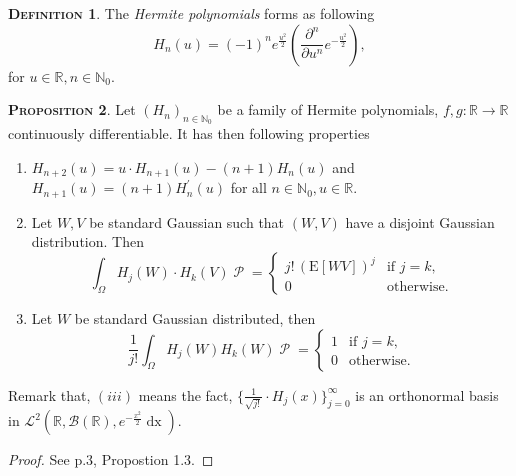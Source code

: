 \documentclass[a4paper, twoside, 11pt]{article}
\theoremstyle{definition}
\newtheorem{definition}{\scshape Definition}[section]
\newtheorem{proposition}[definition]{\scshape Proposition}
\begin{document}
\begin{definition}
  The \emph{Hermite polynomials} forms as following
  \begin{equation}
	H_n(u) = (-1)^n e^{\frac{u^2}{2}} (\frac{\partial^n }{\partial u^n}e^{-\frac{u^2}{2}}),
	\label{sec:hermite}
  \end{equation}
  for $u\in \mathbb{R}, n\in \mathbb{N}_0$. 
\end{definition}
\begin{proposition}
  Let $(H_n)_{n\in \mathbb{N}_0}$ be a family of Hermite polynomials, $f, g: \mathbb{R}\rightarrow \mathbb{R}$ continuously differentiable. It has then following properties 
  \begin{enumerate}[topsep=0pt, itemsep=-1ex, partopsep=1ex, parsep=1ex, label=(\roman*)]
	\item  $H_{n+2}(u)=u\cdot H_{n+1}(u) - (n+1)H_n(u)$  and $H_{n+1}(u)= (n+1)H^{'}_n(u)$ for all $n\in\mathbb{N}_0, u\in\mathbb{R}$.
	\item Let $W, V$ be standard Gaussian such that $(W, V)$ have a disjoint Gaussian distribution. Then
	  \begin{equation*}
		\int_{\Omega} H_j(W)\cdot H_k(V) \mathop{\mathcal{P}} = \begin{cases} j!\,(\mathrm{E}[WV])^j & \mbox{if } j=k,\\
		  0 &\text{otherwise}.
		\end{cases}
	  \end{equation*}
	\item Let $W$ be standard Gaussian distributed, then
	  \begin{equation*}
		\frac{1}{j!} \int_\Omega H_j(W) H_k(W) \mathop{\mathcal{P}} = \begin{cases} 1 & \mbox{if } j=k,\\
		  0 & \text{otherwise}.
		\end{cases}
	  \end{equation*}
\end{enumerate}
Remark that, $(iii)$ means the fact, $\{\frac{1}{\sqrt{j!}}\cdot H_j(x)\}_{j=0}^{\infty}$ is an orthonormal basis in $\mathcal{L}^2(\mathbb{R}, \mathscr{B}(\mathbb{R}), e^{-\frac{x^2}{2}}\mathop{dx})$.
		\label{sec:herpro}
\end{proposition}
\begin{proof}
  See \cite{nourdin} p.3, Propostion 1.3.
\end{proof}
\end{document}
